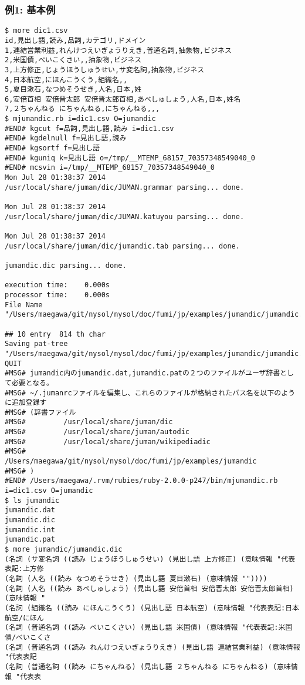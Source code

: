\subsubsection*{例1: 基本例}



\begin{Verbatim}[baselinestretch=0.7,frame=single]
$ more dic1.csv
id,見出し語,読み,品詞,カテゴリ,ドメイン
1,連結営業利益,れんけつえいぎょうりえき,普通名詞,抽象物,ビジネス
2,米国債,べいこくさい,,抽象物,ビジネス
3,上方修正,じょうほうしゅうせい,サ変名詞,抽象物,ビジネス
4,日本航空,にほんこうくう,組織名,,
5,夏目漱石,なつめそうせき,人名,日本,姓
6,安倍首相 安倍晋太郎 安倍晋太郎首相,あべしゅしょう,人名,日本,姓名
7,２ちゃんねる にちゃんねる,にちゃんねる,,,
$ mjumandic.rb i=dic1.csv O=jumandic
#END# kgcut f=品詞,見出し語,読み i=dic1.csv
#END# kgdelnull f=見出し語,読み
#END# kgsortf f=見出し語
#END# kguniq k=見出し語 o=/tmp/__MTEMP_68157_70357348549040_0
#END# mcsvin i=/tmp/__MTEMP_68157_70357348549040_0
Mon Jul 28 01:38:37 2014
/usr/local/share/juman/dic/JUMAN.grammar parsing... done.

Mon Jul 28 01:38:37 2014
/usr/local/share/juman/dic/JUMAN.katuyou parsing... done.

Mon Jul 28 01:38:37 2014
/usr/local/share/juman/dic/jumandic.tab parsing... done.

jumandic.dic parsing... done.

execution time:    0.000s
processor time:    0.000s
File Name "/Users/maegawa/git/nysol/nysol/doc/fumi/jp/examples/jumandic/jumandic.dat"

## 10 entry  814 th char
Saving pat-tree "/Users/maegawa/git/nysol/nysol/doc/fumi/jp/examples/jumandic/jumandic.pat" 
QUIT
#MSG# jumandic内のjumandic.dat,jumandic.patの２つのファイルがユーザ辞書として必要となる。
#MSG# ~/.jumanrcファイルを編集し、これらのファイルが格納されたパス名を以下のように追加登録す
#MSG# (辞書ファイル
#MSG#         /usr/local/share/juman/dic
#MSG#         /usr/local/share/juman/autodic
#MSG#         /usr/local/share/juman/wikipediadic
#MSG#         /Users/maegawa/git/nysol/nysol/doc/fumi/jp/examples/jumandic
#MSG# )
#END# /Users/maegawa/.rvm/rubies/ruby-2.0.0-p247/bin/mjumandic.rb i=dic1.csv O=jumandic
$ ls jumandic
jumandic.dat
jumandic.dic
jumandic.int
jumandic.pat
$ more jumandic/jumandic.dic
(名詞 (サ変名詞 ((読み じょうほうしゅうせい) (見出し語 上方修正) (意味情報 "代表表記:上方修
(名詞 (人名 ((読み なつめそうせき) (見出し語 夏目漱石) (意味情報 ""))))
(名詞 (人名 ((読み あべしゅしょう) (見出し語 安倍首相 安倍晋太郎 安倍晋太郎首相) (意味情報 "
(名詞 (組織名 ((読み にほんこうくう) (見出し語 日本航空) (意味情報 "代表表記:日本航空/にほん
(名詞 (普通名詞 ((読み べいこくさい) (見出し語 米国債) (意味情報 "代表表記:米国債/べいこくさ
(名詞 (普通名詞 ((読み れんけつえいぎょうりえき) (見出し語 連結営業利益) (意味情報 "代表表記
(名詞 (普通名詞 ((読み にちゃんねる) (見出し語 ２ちゃんねる にちゃんねる) (意味情報 "代表表
\end{Verbatim}

